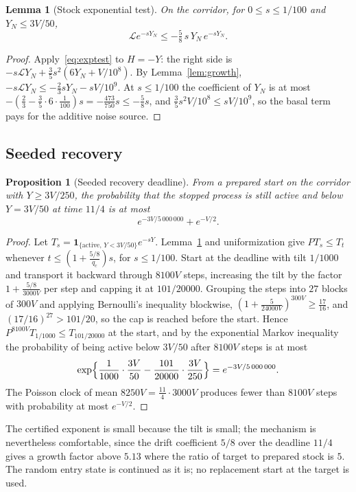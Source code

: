 \documentclass[11pt,a4paper]{article}
\theoremstyle{plain}
\newtheorem{proposition}[theorem]{Proposition}
\newtheorem{lemma}[theorem]{Lemma}
\theoremstyle{definition}
\theoremstyle{remark}
\newcommand{\Lgen}{\mathcal L}
\newcommand{\one}{\mathbf 1}
\begin{document}
\begin{lemma}[Stock exponential test]\label{lem:stocktest}
On the corridor, for $0\le s\le1/100$ and $Y_N\le3V/50$,
\[
\Lgen e^{-sY_N}\le-\tfrac58\,s\,Y_N\,e^{-sY_N}.
\]
\end{lemma}
\begin{proof}
Apply~\eqref{eq:exptest} to $H=-Y$: the right side is $-s\Lgen Y_N+\tfrac35s^2(6Y_N+V/10^8)$. By Lemma~\ref{lem:growth}, $-s\Lgen Y_N\le-\tfrac23sY_N-sV/10^9$. At $s\le1/100$ the coefficient of $Y_N$ is at most $-(\tfrac23-\tfrac35\cdot6\cdot\tfrac1{100})s=-\tfrac{473}{750}s\le-\tfrac58s$, and $\tfrac35s^2V/10^8\le sV/10^9$, so the basal term pays for the additive noise source.
\end{proof}

\subsection{Seeded recovery}
\begin{proposition}[Seeded recovery deadline]\label{prop:entry}
From a prepared start on the corridor with $Y\ge3V/250$, the probability that the stopped process is still active and below $Y=3V/50$ at time $11/4$ is at most
\[
e^{-3V/5\,000\,000}+e^{-V/2}.
\]
\end{proposition}
\begin{proof}
Let $T_s=\one_{\{\text{active},\,Y<3V/50\}}e^{-sY}$. Lemma~\ref{lem:stocktest} and uniformization give $PT_s\le T_t$ whenever $t\le(1+\tfrac{5/8}{q_c})s$, for $s\le1/100$. Start at the deadline with tilt $1/1000$ and transport it backward through $8100V$ steps, increasing the tilt by the factor $1+\tfrac{5/8}{3000V}$ per step and capping it at $101/20000$. Grouping the steps into $27$ blocks of $300V$ and applying Bernoulli's inequality blockwise, $(1+\tfrac{5}{24000V})^{300V}\ge\tfrac{17}{16}$, and $(17/16)^{27}>101/20$, so the cap is reached before the start. Hence $P^{8100V}T_{1/1000}\le T_{101/20000}$ at the start, and by the exponential Markov inequality the probability of being active below $3V/50$ after $8100V$ steps is at most
\[
\exp\Bigl\{\frac1{1000}\cdot\frac{3V}{50}-\frac{101}{20000}\cdot\frac{3V}{250}\Bigr\}=e^{-3V/5\,000\,000}.
\]
The Poisson clock of mean $8250V=\tfrac{11}4\cdot3000V$ produces fewer than $8100V$ steps with probability at most $e^{-V/2}$.
\end{proof}
The certified exponent is small because the tilt is small; the mechanism is nevertheless comfortable, since the drift coefficient $5/8$ over the deadline $11/4$ gives a growth factor above $5.13$ where the ratio of target to prepared stock is $5$. The random entry state is continued as it is; no replacement start at the target is used.
\end{document}
